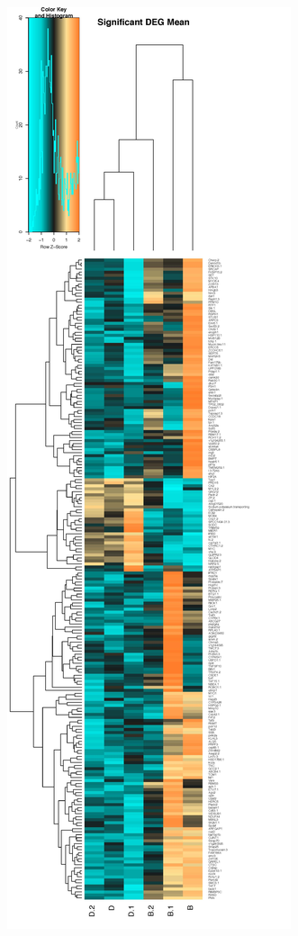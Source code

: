 \documentclass[
]{article}
\begin{document}
\includegraphics{Ofav 0.5 Sig DEG Mean Heatmap.jpg}
\end{document}
